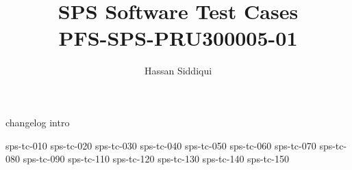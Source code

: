 \documentclass[12pt]{article}
\begin{document}
\title{\acrshort{SPS} Software Test Cases \\ \large PFS-SPS-PRU300005-01}
\author{Hassan Siddiqui}
\maketitle

\tableofcontents
\newpage

%
%
{changelog}
{intro}
\newpage

%
%
{sps-tc-010}
\newpage
{sps-tc-020}
\newpage
{sps-tc-030}
\newpage
{sps-tc-040}
\newpage
{sps-tc-050}
\newpage
{sps-tc-060}
\newpage
{sps-tc-070}
\newpage
{sps-tc-080}
\newpage
{sps-tc-090}
\newpage
{sps-tc-110}
\newpage
{sps-tc-120}
\newpage
{sps-tc-130}
\newpage
{sps-tc-140}
\newpage
{sps-tc-150}
\newpage

%
%
\printglossary[type=\acronymtype]
\printglossary
\end{document}
